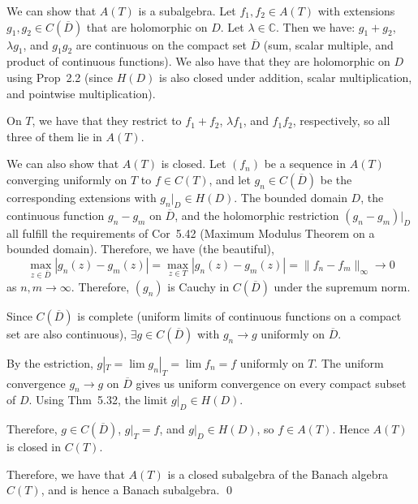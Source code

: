 \documentclass[a4paper]{article}
\begin{document}
\medskip
We can show that $A(T)$ is a subalgebra. Let $f_1, f_2 \in A(T)$ with extensions $g_1, g_2 \in
C(\overline{D})$ that are holomorphic on $D$. Let $\lambda \in \mathbb{C}$. Then we have:
$g_1 + g_2$, $\lambda g_1$, and $g_1 g_2$ are continuous on the compact set $\overline{D}$
(sum, scalar multiple, and product of continuous functions). We also have that they are holomorphic on $D$ using
Prop~2.2 (since $H(D)$ is also closed under addition, scalar multiplication, and pointwise
multiplication). 


On $T$, we have that they restrict to $f_1 + f_2$, $\lambda f_1$, and $f_1 f_2$, respectively, so all three of them lie in $A(T)$.

\medskip
We can also show that $A(T)$ is closed. Let $(f_n)$ be a sequence in $A(T)$ converging uniformly on $T$ to
$f \in C(T)$, and let $g_n \in C(\overline{D})$ be the corresponding extensions with $g_n|_D
\in H(D)$. The bounded domain $D$, the continuous function $g_n - g_m$ on $\overline{D}$, and
the holomorphic restriction $(g_n - g_m)|_D$ all fulfill the requirements of Cor~5.42 (Maximum Modulus
Theorem on a bounded domain). Therefore, we have (the beautiful),
\[
\max_{z \in \overline{D}}|g_n(z) - g_m(z)|
= \max_{z \in T}|g_n(z) - g_m(z)|
= \|f_n - f_m\|_\infty
\to 0
\]
as $n, m \to \infty$. Therefore, $(g_n)$ is Cauchy in $C(\overline{D})$ under the supremum norm.


Since $C(\overline{D})$ is complete (uniform limits of continuous functions on a compact set
are also continuous), $\exists g \in C(\overline{D})$ with $g_n \to g$ uniformly on $\overline{D}$.

\medskip
By the estriction, $g|_T = \lim g_n|_T = \lim f_n = f$ uniformly on $T$. The uniform convergence
$g_n \to g$ on $\overline{D}$ gives us uniform convergence on every compact subset of $D$. Using Thm~5.32, the limit $g|_D \in H(D)$.

\medskip
Therefore, $g \in C(\overline{D})$, $g|_T = f$, and $g|_D \in H(D)$, so $f \in A(T)$. Hence $A(T)$ is closed in $C(T)$.

\medskip
Therefore, we have that $A(T)$ is a closed subalgebra of the Banach algebra $C(T)$, and is hence a Banach subalgebra. \qed
\end{document}
